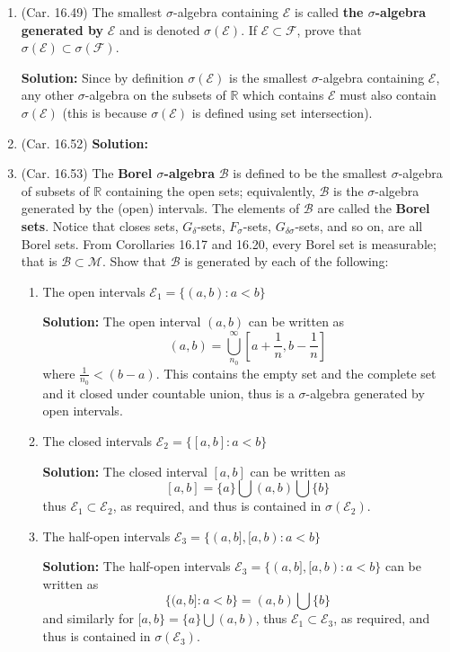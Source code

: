\documentclass{article}
\def\RR{\mathbb R}
\begin{document}
\begin{enumerate}
\item (Car. 16.49) The smallest $\sigma$-algebra containing
$\mathcal{E}$ is called \textbf{the $\sigma$-algebra generated by}
$\mathcal{E}$ and is denoted $\sigma(\mathcal{E})$. 
If $\mathcal{E}\subset\mathcal{F}$, prove that
$\sigma(\mathcal{E})\subset \sigma(\mathcal{F})$.

\textbf{Solution:} Since by definition $\sigma(\mathcal{E})$ is
the smallest $\sigma$-algebra containing $\mathcal{E}$, any other
$\sigma$-algebra on the subsets of $\RR$ which contains $\mathcal{E}$
must also contain $\sigma(\mathcal{E})$ (this is 
because $\sigma(\mathcal{E})$ is defined using set intersection).

\item (Car. 16.52) 
\textbf{Solution:}


\item (Car. 16.53) The \textbf{Borel $\sigma$-algebra} $\mathcal{B}$ is defined to be the smallest
  $\sigma$-algebra of subsets of $\RR$ containing the open sets; equivalently, $\mathcal{B}$ is the
  $\sigma$-algebra generated by the (open) intervals. The elements of $\mathcal{B}$ are called the
  \textbf{Borel sets}. Notice that closes sets, $G_\delta$-sets, $F_\sigma$-sets, $G_{\delta\sigma}$-sets, and so
  on, are all Borel sets. From Corollaries 16.17 and 16.20, every Borel set is measurable; that
  is $\mathcal{B} \subset \mathcal{M}$. Show that $\mathcal{B}$ is generated by each of the following:
  \begin{enumerate}
  \item The open intervals $\mathcal{E}_1=\{(a,b): a<b\}$

    \textbf{Solution:} The open interval $(a,b)$ can be written as
\[
(a,b) = \bigcup_{n_0}^\infty \left[ a+\frac{1}{n}, b-\frac{1}{n} \right]
\]
where $\frac{1}{n_0} < (b-a)$. This contains the empty set and the complete
set and it closed under countable union, thus is a $\sigma$-algebra
generated by open intervals.
     
\item The closed intervals $\mathcal{E}_2=\{[a,b]: a<b\}$

  \textbf{Solution:} The closed interval $[a,b]$ can be written as
\[
[a,b] = \{a\} \bigcup (a,b) \bigcup \{b\}
\]
thus $\mathcal{E}_1 \subset \mathcal{E}_2$, as required, and thus
is contained in $\sigma(\mathcal{E}_2)$.
\item The half-open intervals $\mathcal{E}_3=\{(a,b],[a,b): a<b\}$

    \textbf{Solution:} The half-open 
intervals $\mathcal{E}_3=\{(a,b],[a,b): a<b\}$ can be written as
\[
\{(a,b]: a<b\} = (a,b) \bigcup \{b\}
\]
and similarly for $[a,b\}=\{a\} \bigcup (a,b)$, thus
$\mathcal{E}_1 \subset \mathcal{E}_3$, as required, and thus
is contained in $\sigma(\mathcal{E}_3)$.


\end{enumerate}
\end{enumerate}
\end{document}
